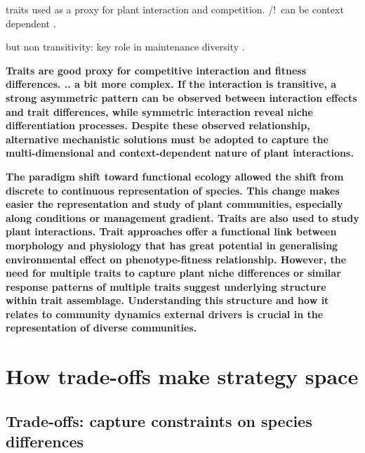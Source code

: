 traits used as a proxy for plant interaction and competition. /!\ can be context dependent \parencite{gallaway_2003}.

but non transitivity: key role in maintenance diversity \cite{levine_beyond_2017}.

\textbf{Traits are good proxy for competitive interaction and fitness differences. .. a bit more complex. If the interaction is transitive, a strong asymmetric pattern can be observed between interaction effects and trait differences, while symmetric interaction reveal niche differentiation processes. Despite these observed relationship, alternative mechanistic solutions must be adopted to capture the multi-dimensional and context-dependent nature of plant interactions.}


\textbf{The paradigm shift toward functional ecology allowed the shift from discrete to continuous representation of species. This change makes easier the representation and study of plant communities, especially along conditions or management gradient. Traits are also used to study plant interactions.  Trait approaches offer a functional link between morphology and physiology that has great potential in generalising environmental effect on phenotype-fitness relationship. However, the need for multiple traits to capture plant niche differences or similar response patterns of multiple traits suggest underlying structure within trait assemblage. Understanding this structure and how it relates to community dynamics external drivers is crucial in the representation of diverse communities. } 





\section{How trade-offs make strategy space}

\subsection{Trade-offs: capture constraints on species differences}

